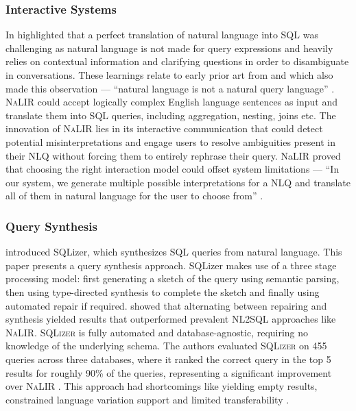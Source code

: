 \subsubsection{Interactive Systems}

In \citeyear{NALIR} \citeauthor*{NALIR} highlighted that a perfect translation
of natural language into SQL was challenging as natural language is not made
for query expressions and heavily relies on contextual information and
clarifying questions in order to disambiguate in conversations. These learnings
relate to early prior art from \citeauthor{UnnaturalQueryLanguage} and
\citeauthor{Rendezvous} which also made this observation — ``natural language
is not a natural query language'' \citep{UnnaturalQueryLanguage}.
\textsc{NaLIR} could accept logically complex English language sentences as
input and translate them into SQL queries, including aggregation, nesting,
joins etc. The innovation of \textsc{NaLIR} lies in its interactive
communication that could detect potential misinterpretations and engage users
to resolve ambiguities present in their NLQ without forcing
them to entirely rephrase their query. NaLIR proved that choosing the right
interaction model could offset system limitations — ``In our system, we
generate multiple possible interpretations for a NLQ and
translate all of them in natural language for the user to choose from''
\citep{NALIR}.

\subsubsection{Query Synthesis}

\citeauthor{SQLizer} introduced SQLizer, which synthesizes SQL queries from
natural language. This paper presents a query synthesis approach. SQLizer makes
use of a three stage processing model: first generating a sketch of the query
using semantic parsing, then using type-directed synthesis to complete the
sketch and finally using automated repair if required. \citeauthor*{SQLizer}
showed that alternating between repairing and synthesis yielded results that
outperformed prevalent NL2SQL approaches like \textsc{NaLIR}. \textsc{SQLizer}
is fully automated and database-agnostic, requiring no knowledge of the
underlying schema. The authors evaluated \textsc{SQLizer} on 455 queries across
three databases, where it ranked the correct query in the top 5 results for
roughly 90\% of the queries, representing a significant improvement over
\textsc{NaLIR} \citep{NALIR}. This approach had shortcomings like yielding
empty results, constrained language variation support and limited
transferability \citep[p.22-23]{SQLizer}.

